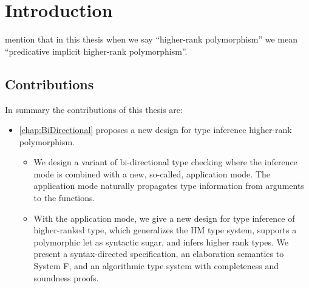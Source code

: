 \chapter{Introduction}

mention that in this thesis when we say ``higher-rank polymorphism'' we mean
``predicative implicit higher-rank polymorphism''.

\section{Contributions}

In summary the contributions of this thesis are:

\begin{itemize}

\item \cref{chap:BiDirectional} proposes a new design for type inference
  higher-rank polymorphism.
  \begin{itemize}
  \item We design a variant of bi-directional type checking
    where the inference mode is combined with a new, so-called, application
    mode. The application mode naturally propagates type information from
    arguments to the functions.
  \item With the application mode, we give a new design for type inference of
    higher-ranked type, which generalizes the HM type system, supports a
    polymorphic let as syntactic sugar, and infers higher rank types. We present
    a syntax-directed specification, an elaboration semantics to System F, and
    an algorithmic type system with completeness and soundness proofs.
  \end{itemize}


\end{itemize}
